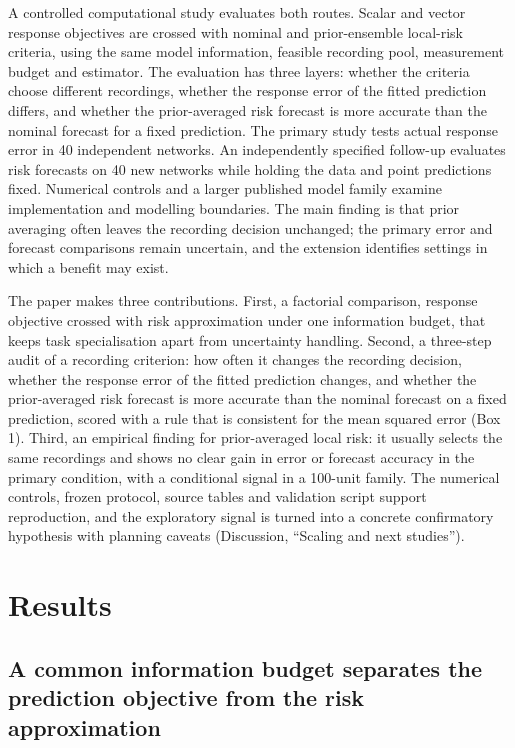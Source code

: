 A controlled computational study evaluates both routes. Scalar and vector response objectives are crossed with nominal and prior-ensemble local-risk criteria, using the same model information, feasible recording pool, measurement budget and estimator. The evaluation has three layers: whether the criteria choose different recordings, whether the response error of the fitted prediction differs, and whether the prior-averaged risk forecast is more accurate than the nominal forecast for a fixed prediction. The primary study tests actual response error in 40 independent networks. An independently specified follow-up evaluates risk forecasts on 40 new networks while holding the data and point predictions fixed. Numerical controls and a larger published model family examine implementation and modelling boundaries. The main finding is that prior averaging often leaves the recording decision unchanged; the primary error and forecast comparisons remain uncertain, and the extension identifies settings in which a benefit may exist.

The paper makes three contributions. First, a factorial comparison, response objective crossed with risk approximation under one information budget, that keeps task specialisation apart from uncertainty handling. Second, a three-step audit of a recording criterion: how often it changes the recording decision, whether the response error of the fitted prediction changes, and whether the prior-averaged risk forecast is more accurate than the nominal forecast on a fixed prediction, scored with a rule that is consistent for the mean squared error (Box 1). Third, an empirical finding for prior-averaged local risk: it usually selects the same recordings and shows no clear gain in error or forecast accuracy in the primary condition, with a conditional signal in a 100-unit family. The numerical controls, frozen protocol, source tables and validation script support reproduction, and the exploratory signal is turned into a concrete confirmatory hypothesis with planning caveats (Discussion, ``Scaling and next studies'').

\section{Results}

\subsection{A common information budget separates the prediction objective from the risk approximation}

